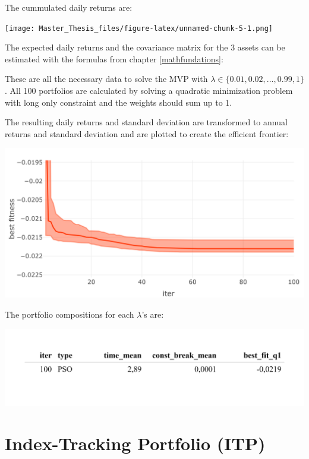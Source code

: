 \documentclass[
  oneside]{book}
\begin{document}
The cummulated daily returns are:

\texttt{[image: Master\_Thesis\_files/figure-latex/unnamed-chunk-5-1.png]}

The expected daily returns and the covariance matrix for the 3 assets can be estimated with the formulas from chapter \ref{mathfundations}:

These are all the necessary data to solve the MVP with \(\lambda \in \{0.01, 0.02, ..., 0.99, 1\}\). All 100 portfolios are calculated by solving a quadratic minimization problem with long only constraint and the weights should sum up to 1.

The resulting daily returns and standard deviation are transformed to annual returns and standard deviation and are plotted to create the efficient frontier:

\includegraphics{Master_Thesis_files/figure-latex/unnamed-chunk-8-1.png}

The portfolio compositions for each \(\lambda\)'s are:

\includegraphics{Master_Thesis_files/figure-latex/unnamed-chunk-9-1.png}

\hypertarget{index-tracking-portfolio-itp}{%
\section{Index-Tracking Portfolio (ITP)}\label{index-tracking-portfolio-itp}}
\end{document}
